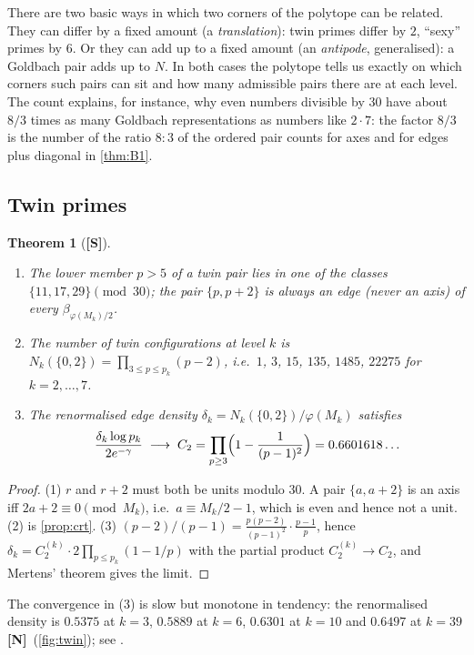 \documentclass[11pt,a4paper]{article}
\newcommand{\statS}{\textsf{\textbf{[S]}}}
\newcommand{\statN}{\textsf{\textbf{[N]}}}
\theoremstyle{plain}
\newtheorem{theorem}{Theorem}[section]
\theoremstyle{definition}
\theoremstyle{remark}
\begin{document}
\begin{plainwords}
There are two basic ways in which two corners of the polytope can be related.
They can differ by a fixed amount (a \emph{translation}): twin primes differ by
$2$, ``sexy'' primes by $6$. Or they can add up to a fixed amount (an
\emph{antipode}, generalised): a Goldbach pair adds up to $N$. In both cases
the polytope tells us exactly on which corners such pairs can sit and how many
admissible pairs there are at each level. The count explains, for instance,
why even numbers divisible by $30$ have about $8/3$ times as many Goldbach
representations as numbers like $2\cdot7$: the factor $8/3$ is the number of
the ratio $8:3$ of the ordered pair counts for axes and for edges plus diagonal in
\cref{thm:B1}.
\end{plainwords}

\subsection{Twin primes}
\begin{theorem}[\statS]\label{thm:twin}
\begin{enumerate}[itemsep=0pt]
\item The lower member $p>5$ of a twin pair lies in one of the classes
$\{11,17,29\}\pmod{30}$; the pair $\{p,p+2\}$ is always an edge (never an axis)
of every $\beta_{\varphi(M_k)/2}$.
\item The number of twin configurations at level $k$ is
$N_k(\{0,2\})=\prod_{3\le p\le p_k}(p-2)$, i.e.\ $1$, $3$, $15$, $135$, $1485$, $22275$ for
$k=2,\dots,7$.
\item The renormalised edge density
$\delta_k=N_k(\{0,2\})/\varphi(M_k)$ satisfies
\[\frac{\delta_k\log p_k}{2e^{-\gamma}}\;\longrightarrow\;C_2=\prod_{p\ge3}\Bigl(1-\frac1{(p-1)^{2}}\Bigr)=0.6601618\ldots\]
\end{enumerate}
\end{theorem}
\begin{proof}
(1) $r$ and $r+2$ must both be units modulo $30$. A pair $\{a,a+2\}$ is an axis
iff $2a+2\equiv0\pmod{M_k}$, i.e.\ $a\equiv M_k/2-1$, which is even and hence
not a unit. (2) is \cref{prop:crt}. (3)
$(p-2)/(p-1)=\frac{p(p-2)}{(p-1)^2}\cdot\frac{p-1}p$, hence
$\delta_k=C_2^{(k)}\cdot2\prod_{p\le p_k}(1-1/p)$ with the partial product
$C_2^{(k)}\to C_2$, and Mertens' theorem gives the limit.
\end{proof}
The convergence in (3) is slow but monotone in tendency: the renormalised
density is $0.5375$ at $k=3$, $0.5889$ at $k=6$, $0.6301$ at $k=10$ and
$0.6497$ at $k=39$ \statN\ (\cref{fig:twin}); see \cite{K-c2,K-twin}.
\end{document}
